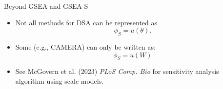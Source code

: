 \documentclass{beamer}
\begin{document}
\begin{frame}[label={sec:org8f90c24}]{Beyond GSEA and GSEA-S}
\begin{itemize}
\item Not all methods for DSA can be represented as \[\phi_{S}=u(\theta).\]
\end{itemize}
\vfill
\begin{itemize}
\item Some (e.g., CAMERA) can only be written as:  \[\phi_{S}=u(W)\]
\end{itemize}
\vfill
\begin{itemize}
\item See McGovern et al. (2023) \textit{PLoS Comp. Bio} for sensitivity analysis algorithm using scale models.
\end{itemize}
\end{frame}
\end{document}
